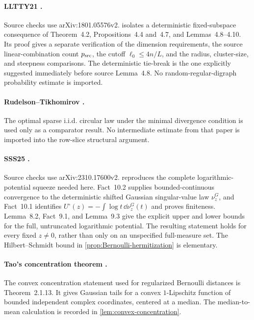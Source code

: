\paragraph{LLTTY21 \cite{LLTTY21}.}
Source checks use arXiv:1801.05576v2.  isolates a deterministic fixed-subspace consequence of Theorem~4.2, Propositions~4.4 and~4.7, and Lemmas~4.8--4.10. Its proof gives a separate verification of the dimension requirements, the source linear-combination count $p_{\mathrm{src}}$, the cutoff $\ell_0\le4n/L$, and the radius, cluster-size, and steepness comparisons. The deterministic tie-break is the one explicitly suggested immediately before source Lemma~4.8. No random-regular-digraph probability estimate is imported.

\paragraph{Rudelson--Tikhomirov \cite{RT19}.}
The optimal sparse i.i.d. circular law under the minimal divergence condition is used only as a comparator result. No intermediate estimate from that paper is imported into the row-slice structural argument.

\paragraph{SSS25 \cite{SSS25}.}
Source checks use arXiv:2310.17600v2.  reproduces the complete logarithmic-potential squeeze needed here. Fact~10.2 supplies bounded-continuous convergence to the deterministic shifted Gaussian singular-value law $\nu_z^G$, and Fact~10.1 identifies $U^\circ(z)=-\int\log t\,\dd\nu_z^G(t)$ and proves finiteness. Lemma~8.2, Fact~9.1, and Lemma~9.3 give the explicit upper and lower bounds for the full, untruncated logarithmic potential. The resulting statement holds for every fixed $z\ne0$, rather than only on an unspecified full-measure set. The Hilbert--Schmidt bound in \cref{prop:Bernoulli-hermitization} is elementary.

\paragraph{Tao's concentration theorem \cite{Tao12}.}
The convex concentration statement used for regularized Bernoulli distances is Theorem~2.1.13. It gives Gaussian tails for a convex $1$-Lipschitz function of bounded independent complex coordinates, centered at a median. The median-to-mean calculation is recorded in \cref{lem:convex-concentration}.

